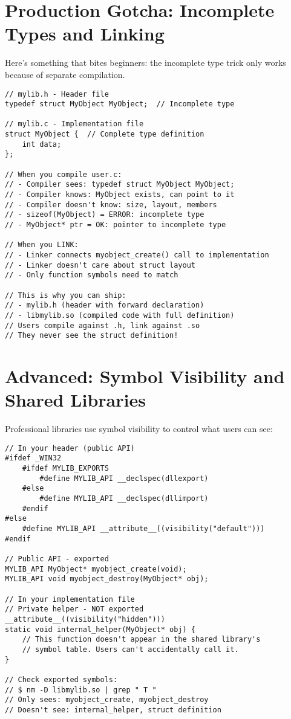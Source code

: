 \section{Production Gotcha: Incomplete Types and Linking}

Here's something that bites beginners: the incomplete type trick only works because of separate compilation.

\begin{lstlisting}
// mylib.h - Header file
typedef struct MyObject MyObject;  // Incomplete type

// mylib.c - Implementation file
struct MyObject {  // Complete type definition
    int data;
};

// When you compile user.c:
// - Compiler sees: typedef struct MyObject MyObject;
// - Compiler knows: MyObject exists, can point to it
// - Compiler doesn't know: size, layout, members
// - sizeof(MyObject) = ERROR: incomplete type
// - MyObject* ptr = OK: pointer to incomplete type

// When you LINK:
// - Linker connects myobject_create() call to implementation
// - Linker doesn't care about struct layout
// - Only function symbols need to match

// This is why you can ship:
// - mylib.h (header with forward declaration)
// - libmylib.so (compiled code with full definition)
// Users compile against .h, link against .so
// They never see the struct definition!
\end{lstlisting}

\section{Advanced: Symbol Visibility and Shared Libraries}

Professional libraries use symbol visibility to control what users can see:

\begin{lstlisting}
// In your header (public API)
#ifdef _WIN32
    #ifdef MYLIB_EXPORTS
        #define MYLIB_API __declspec(dllexport)
    #else
        #define MYLIB_API __declspec(dllimport)
    #endif
#else
    #define MYLIB_API __attribute__((visibility("default")))
#endif

// Public API - exported
MYLIB_API MyObject* myobject_create(void);
MYLIB_API void myobject_destroy(MyObject* obj);

// In your implementation file
// Private helper - NOT exported
__attribute__((visibility("hidden")))
static void internal_helper(MyObject* obj) {
    // This function doesn't appear in the shared library's
    // symbol table. Users can't accidentally call it.
}

// Check exported symbols:
// $ nm -D libmylib.so | grep " T "
// Only sees: myobject_create, myobject_destroy
// Doesn't see: internal_helper, struct definition
\end{lstlisting}

